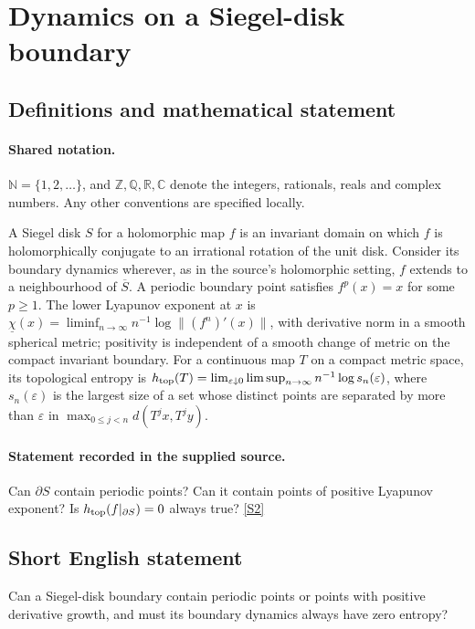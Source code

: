 \documentclass[11pt]{article}
\newcommand{\sref}[2]{\hyperlink{source:#1:#2}{[S#2]}}
\begin{document}
\section{Dynamics on a Siegel-disk boundary}\label{statement}

\subsection{Definitions and mathematical statement}

\paragraph{Shared notation.}$\mathbb N=\{1,2,\ldots\}$, and $\mathbb Z,\mathbb Q,\mathbb R,\mathbb C$ denote the integers, rationals, reals and complex numbers. Any other conventions are specified locally.


A Siegel disk $S$ for a holomorphic map $f$ is an invariant domain on which $f$ is holomorphically conjugate to an irrational rotation of the unit disk. Consider its boundary dynamics wherever, as in the source's holomorphic setting, $f$ extends to a neighbourhood of $\overline S$. A periodic boundary point satisfies $f^p(x)=x$ for some $p\geq1$. The lower Lyapunov exponent at $x$ is $\underline\chi(x)=\liminf_{n\to\infty}n^{-1}\log\|(f^n)'(x)\|$, with derivative norm in a smooth spherical metric; positivity is independent of a smooth change of metric on the compact invariant boundary. For a continuous map $T$ on a compact metric space, its topological entropy is $h_{\rm top}(T)=\lim_{\varepsilon\downarrow0}\limsup_{n\to\infty}n^{-1}\log s_n(\varepsilon)$, where $s_n(\varepsilon)$ is the largest size of a set whose distinct points are separated by more than $\varepsilon$ in $\max_{0\leq j<n}d(T^jx,T^jy)$.
\paragraph{Statement recorded in the supplied source.}
Can $\partial S$ contain periodic points? Can it contain points of positive Lyapunov exponent? Is $h_{\rm top}(f|_{\partial S})=0$ always true? \sref{statement}{2}
\subsection{Short English statement}
Can a Siegel-disk boundary contain periodic points or points with positive derivative growth, and must its boundary dynamics always have zero entropy?
\end{document}
